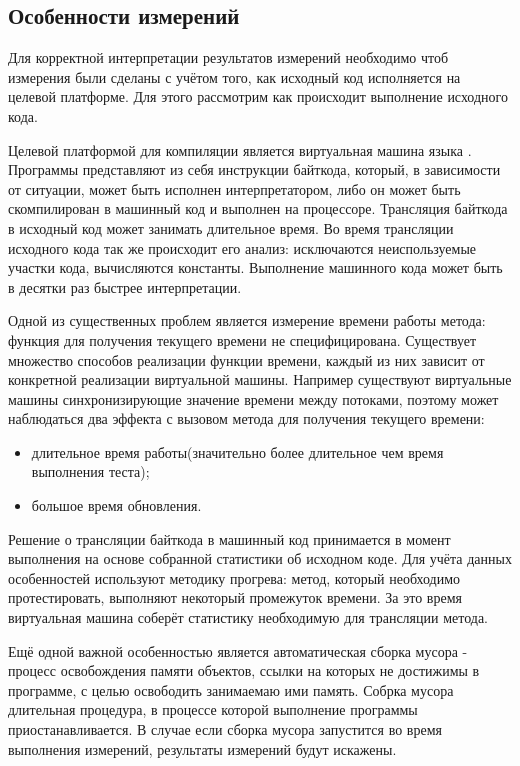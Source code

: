 \subsection{Особенности измерений}
Для корректной интерпретации результатов измерений необходимо чтоб измерения были сделаны с учётом того, как исходный код исполняется на целевой платформе. Для этого рассмотрим как происходит выполнение исходного кода.

Целевой платформой для компиляции является виртуальная машина языка . Программы представляют из себя инструкции байткода, который, в зависимости от ситуации, может быть исполнен интерпретатором, либо он может быть скомпилирован в машинный код и выполнен на процессоре. Трансляция байткода в исходный код может занимать длительное время. Во время трансляции исходного кода так же происходит его анализ: исключаются неиспользуемые участки кода, вычисляются константы. Выполнение машинного кода может быть в десятки раз быстрее интерпретации.

Одной из существенных проблем является измерение времени работы метода: функция для получения текущего времени не специфицирована. Существует множество способов реализации функции времени, каждый из них зависит от конкретной реализации виртуальной машины. Например существуют виртуальные машины синхронизирующие значение времени между потоками, поэтому может наблюдаться два эффекта с вызовом метода для получения текущего времени:
\begin{itemize}
  \item длительное время работы(значительно более длительное чем время выполнения теста);
  \item большое время обновления.
\end{itemize}

Решение о трансляции байткода в машинный код принимается в момент выполнения на основе собранной статистики об исходном коде. Для учёта данных особенностей используют методику прогрева: метод, который необходимо протестировать, выполняют некоторый промежуток времени. За это время виртуальная машина соберёт статистику необходимую для трансляции метода.

Ещё одной важной особенностью является автоматическая сборка мусора - процесс освобождения памяти объектов, ссылки на которых не достижимы в программе, с целью освободить занимаемаю ими память. Собрка мусора длительная процедура, в процессе которой выполнение программы приостанавливается. В случае если сборка мусора запустится во время выполнения измерений, результаты измерений будут искажены.


